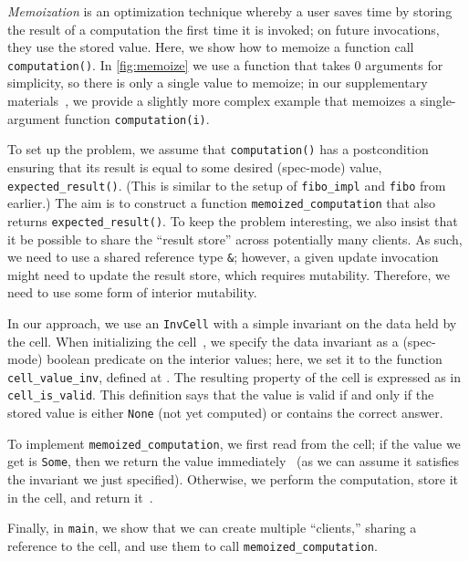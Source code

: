 \emph{Memoization} is an optimization technique whereby a user saves time
by storing the result of a computation the first time it is invoked; on future invocations,
they use the stored value. Here, we show how to memoize a function call
\texttt{computation()}.
In \autoref{fig:memoize} we use a function that takes 0 arguments for simplicity, so there is only a single value to memoize;
in our supplementary materials~\cite{verussupplementary}, we provide a slightly more complex example that memoizes
a single-argument function \texttt{computation(i)}.

To set up the problem, we assume that \verb`computation()` has a postcondition~ ensuring
that its result is equal to some desired (spec-mode) value, \verb`expected_result()`.
(This is similar to the setup of \verb`fibo_impl` and \verb`fibo` from earlier.)
The aim is to construct a function \verb`memoized_computation` that also returns
\verb`expected_result()`.
To keep the problem interesting, we also insist that it be possible to share the 
``result store'' across potentially many clients.
As such, we need to use a shared reference type \verb`&`; however,
a given update invocation might need to update the result store, which requires
mutability. Therefore, we need to use some form of interior mutability.

In our approach, we use
an \verb`InvCell` with a simple invariant on the data held by the cell.
When initializing the cell~, we specify the data invariant as a (spec-mode) boolean predicate on the interior values;
here, we set it to the function \verb`cell_value_inv`, defined at .
The resulting property of the cell is expressed as in \verb`cell_is_valid`.
This definition says that the value is valid if and only if the stored value is either
\verb`None` (not yet computed) or contains the correct answer.

To implement \verb`memoized_computation`, we first read from the cell; if the value we get is
\verb`Some`, then we return the value immediately~ (as we can assume it satisfies the invariant
we just specified).
Otherwise, we perform the computation, store it in the cell,
and return it~.

Finally, in \verb`main`, we show that we can create multiple ``clients,'' sharing a
reference to the cell, and use them to call \verb`memoized_computation`.
